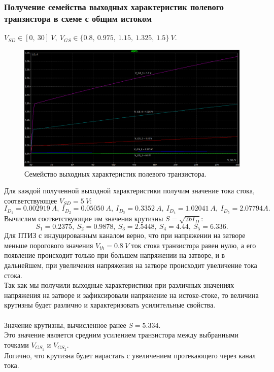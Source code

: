 \documentclass[12pt]{article}
\begin{document}
\subsubsection*{Получение семейства выходных характеристик полевого транзистора в схеме с общим истоком}
$V_{SD} \in [0, \ 30] \ V, \ V_{GS} \in \{0.8, \ 0.975, \ 1.15, \ 1.325, \ 1.5\} \ V.$
\begin{figure}[H]
    \centering
    \includegraphics[width=\textwidth]{2_output_char.png}
    \caption{Семейство выходных характеристик полевого транзистора.}
    \label{fig:2_output_char}
\end{figure}
Для каждой полученной выходной характеристики получим значение тока стока, соответствующее $V_{SD} = 5 \ V$:
\[
    I_{D_1} = 0.002919 \ A, \ I_{D_2} = 0.05050 \ A, \ I_{D_3} = 0.3352 \ A, \ I_{D_4} = 1.02041 \ A, \ I_{D_5} = 2.07794 A.
\]
Вычислим соответствующие им значения крутизны $S = \sqrt{2 b I_D}$:
\[
    S_1 = 0.2375, \ S_2 = 0.9878, \ S_3 = 2.5448, \ S_4 = 4.44, \ S_5 = 6.336.
\]
Для ПТИЗ с индуцированным каналом верно, что при напряжении на затворе меньше порогового значения $V_{th} = 0.8 \ V$ ток стока транзистора равен нулю, а его появление происходит только при большем напряжении на затворе, и в дальнейшем, при увеличения напряжения на затворе происходит увеличение тока стока. \\
Так как мы получили выходные характеристики при различных значениях напряжения на затворе и зафиксировали напряжение на истоке-стоке, то величина крутизны будет различно и характеризовать усилительные свойства. \\
\ \\
Значение крутизны, вычисленное ранее $S = 5.334$. \\
Это значение является средним усилением транзистора между выбранными точками $V_{GS_1}$ и $V_{GS_2}$. \\
Логично, что крутизна будет нарастать с увеличением протекающего через канал тока.
\end{document}
